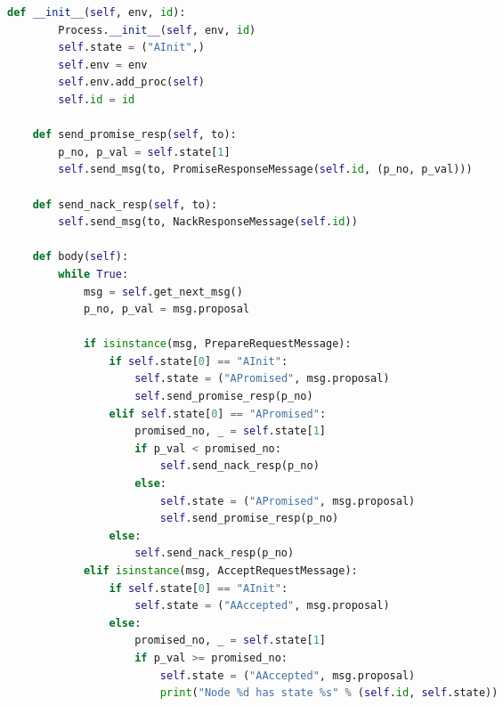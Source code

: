 \begin{landscape}
\begin{multicols*}{2}
\begin{lstlisting}[style=SourceCodeListing,language=Python]
    def __init__(self, env, id):
        Process.__init__(self, env, id)
        self.state = ("AInit",)
        self.env = env
        self.env.add_proc(self)
        self.id = id

    def send_promise_resp(self, to):
        p_no, p_val = self.state[1]
        self.send_msg(to, PromiseResponseMessage(self.id, (p_no, p_val)))

    def send_nack_resp(self, to):
        self.send_msg(to, NackResponseMessage(self.id))

    def body(self):
        while True:
            msg = self.get_next_msg()
            p_no, p_val = msg.proposal

            if isinstance(msg, PrepareRequestMessage):
                if self.state[0] == "AInit":
                    self.state = ("APromised", msg.proposal)
                    self.send_promise_resp(p_no)
                elif self.state[0] == "APromised":
                    promised_no, _ = self.state[1]
                    if p_val < promised_no:
                        self.send_nack_resp(p_no)
                    else:
                        self.state = ("APromised", msg.proposal)
                        self.send_promise_resp(p_no)
                else:
                    self.send_nack_resp(p_no)
            elif isinstance(msg, AcceptRequestMessage):
                if self.state[0] == "AInit":
                    self.state = ("AAccepted", msg.proposal)
                else:
                    promised_no, _ = self.state[1]
                    if p_val >= promised_no:
                        self.state = ("AAccepted", msg.proposal)
                        print("Node %d has state %s" % (self.id, self.state))
\end{lstlisting}

\end{multicols*}
\end{landscape}
\restoregeometry
